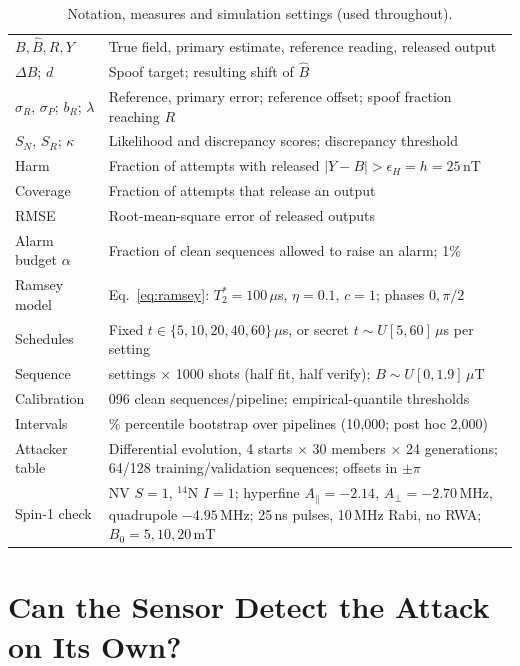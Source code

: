 \documentclass[conference,9pt]{IEEEtran}
\newcommand{\Bhat}{\widehat{B}}
\newcommand{\Ttwo}{T_2^{\ast}}
\begin{document}
\begin{table}[t]
\centering
\caption{Notation, measures and simulation settings (used throughout).}
\label{tab:setup}
\footnotesize
\setlength{\tabcolsep}{3pt}
\renewcommand{\arraystretch}{1.1}
\begin{tabular}{@{}>{\raggedright\arraybackslash}p{}>{\raggedright\arraybackslash}p{}@{}}
\toprule
$B,\Bhat,R,Y$ & True field, primary estimate, reference reading, released output \\
$\Delta B$; $d$ & Spoof target; resulting shift of $\Bhat$ \\
$\sigma_R$, $\sigma_P$; $b_R$; $\lambda$ & Reference, primary error; reference offset; spoof fraction reaching $R$ \\
$S_N$, $S_R$; $\kappa$ & Likelihood and discrepancy scores; discrepancy threshold \\
\midrule
Harm & Fraction of attempts with released $|Y-B|>\epsilon_H=h=25$\,nT \\
Coverage & Fraction of attempts that release an output \\
RMSE & Root-mean-square error of released outputs \\
Alarm budget $\alpha$ & Fraction of clean sequences allowed to raise an alarm; 1\% \\
\midrule
Ramsey model & Eq.~\eqref{eq:ramsey}: $\Ttwo=100\,\mu$s, $\eta=0.1$, $c=1$; phases $0,\pi/2$ \\
Schedules & Fixed $t\in\{5,10,20,40,60\}\,\mu$s, or secret $t\sim U[5,60]\,\mu$s per setting \\
Sequence & 20 settings $\times$ 1000 shots (half fit, half verify); $B\sim U[0,1.9]\,\mu$T \\
Calibration & 4{,}096 clean sequences/pipeline; empirical-quantile thresholds \\
Intervals & 95\% percentile bootstrap over pipelines (10{,}000; post hoc 2{,}000) \\
Attacker table & Differential evolution, 4 starts $\times$ 30 members $\times$ 24 generations; 64/128 training/validation sequences; offsets in $\pm\pi$ \\
Spin-1 check & NV $S{=}1$, $^{14}$N $I{=}1$; hyperfine $A_\parallel{=}-2.14$, $A_\perp{=}-2.70$\,MHz, quadrupole $-4.95$\,MHz; 25\,ns pulses, 10\,MHz Rabi, no RWA; $B_0=5,10,20$\,mT \\
\bottomrule
\end{tabular}
\end{table}

\section{Can the Sensor Detect the Attack on Its Own?}
\label{sec:primary}
\end{document}
